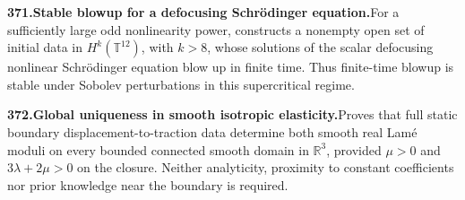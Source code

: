 \documentclass[11pt,a4paper]{article}
\begin{document}
  \par \begin{minipage}{\linewidth}
  \fontsize{10.5}{12.6}\selectfont\RaggedRight
  \hypertarget{result 371}{}
  {\bfseries\textcolor{muted}{371.}\enspace Stable blowup for a defocusing Schr\"odinger equation.}\enspace For a sufficiently large odd nonlinearity power, constructs a nonempty open set of initial data in $H^k(\mathbb T^{12})$, with $k>8$, whose solutions of the scalar defocusing nonlinear Schr\"odinger equation blow up in finite time. Thus finite-time blowup is stable under Sobolev perturbations in this supercritical regime.\par
  \end{minipage}\par\vspace{5pt}




  \par \begin{minipage}{\linewidth}
  \fontsize{10.5}{12.6}\selectfont\RaggedRight
  \hypertarget{result 372}{}
  {\bfseries\textcolor{muted}{372.}\enspace Global uniqueness in smooth isotropic elasticity.}\enspace Proves that full static boundary displacement-to-traction data determine both smooth real Lam\'e moduli on every bounded connected smooth domain in $\mathbb R^3$, provided $\mu>0$ and $3\lambda+2\mu>0$ on the closure. Neither analyticity, proximity to constant coefficients nor prior knowledge near the boundary is required.\par
  \end{minipage}\par\vspace{5pt}
\end{document}
